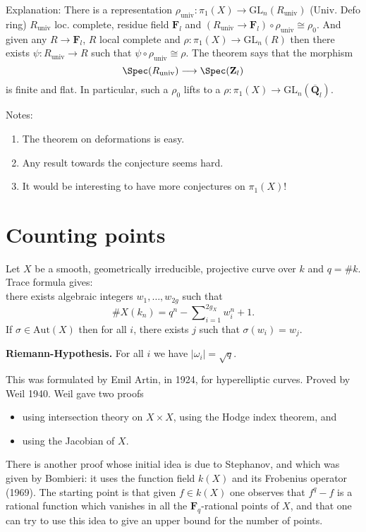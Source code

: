 \noindent
Explanation: There is a representation $\rho_{\text{univ}}:
\pi_1(X)\to \text{GL}_n(R_{\text{univ}})$ (Univ. Defo ring)
$R_{\text{univ}}$ loc.
complete, residue field $\mathbf{F}_l$ and $(R_{\text{univ}}\to
\mathbf{F}_l)\circ\rho_{\text{univ}}\cong\rho_0$.
And given any $R\to \mathbf{F}_l$, $R$ local complete and $\rho: \pi_1(X)\to
\text{GL}_n(R)$ then there exists $\psi: R_{\text{univ}}\to R$ such that
$\psi\circ\rho_{\text{univ}}\cong \rho$. The theorem says that the morphism
$$
\Spec(R_{\text{univ}})
\longrightarrow
\Spec(\mathbf{Z}_l)
$$
is finite and flat. In particular, such a $\rho_0$
lifts to a $\rho : \pi_1(X) \to \text{GL}_n(\overline{\mathbf{Q}}_l)$.

\medskip\noindent
Notes:
\begin{enumerate}
\item The theorem on deformations is easy.
\item Any result towards the conjecture seems hard.
\item It would be interesting to have more conjectures on $\pi_1(X)$!
\end{enumerate}




\section{Counting points}
\label{section-counting}

\noindent
Let $X$ be a smooth, geometrically irreducible,
projective curve over $k$ and $q = \# k$. Trace formula gives:\\
there exists algebraic integers $w_1, \ldots, w_{2g}$ such that
$$
\# X(k_n) = q^n - \sum\nolimits_{i = 1}^{2g_X} w_i^n + 1.
$$
If $\sigma\in \text{Aut}(X)$ then for all $i$, there exists $j$ such that
$\sigma(w_i)=w_j$.

\medskip\noindent
{\bf Riemann-Hypothesis.} For all $i$ we have $|\omega_i| = \sqrt{q}$.

\medskip\noindent
This was formulated by Emil Artin, in 1924, for
hyperelliptic curves. Proved by Weil 1940. Weil gave two proofs
\begin{itemize}
\item using intersection theory on $X \times X$, using the
Hodge index theorem, and
\item using the Jacobian of $X$.
\end{itemize}
There is another proof whose initial idea is due to Stephanov, and
which was given by Bombieri: it uses the function field $k(X)$ and
its Frobenius operator (1969). The starting point is that given
$f\in k(X)$ one observes that $f^q - f$ is a rational function which
vanishes in all the $\mathbf{F}_q$-rational points of $X$, and that one
can try to use this idea to give an upper bound for the number of points.


